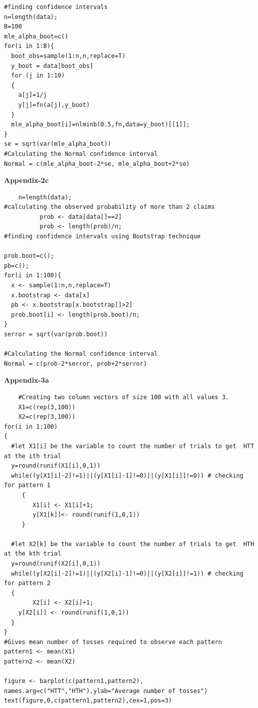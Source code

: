 \documentclass[11pt]{article}
\begin{document}
\begin{enumerate}
\begin{verbatim}
#finding confidence intervals
n=length(data);
B=100
mle_alpha_boot=c()
for(i in 1:B){
  boot_obs=sample(1:n,n,replace=T)
  y_boot = data[boot_obs] 
  for (j in 1:10)
  {
    a[j]=1/j
    y[j]=fn(a[j],y_boot)
  }
  mle_alpha_boot[i]=nlminb(0.5,fn,data=y_boot)[[1]];
}
se = sqrt(var(mle_alpha_boot))
#Calculating the Normal confidence interval
Normal = c(mle_alpha_boot-2*se, mle_alpha_boot+2*se)

	\end{verbatim}


\fontsize{12}{12}
		\textbf{Appendix-2c}
		\fontsize{8}{12}
	\begin{verbatim}
	n=length(data);
#calculating the observed probability of more than 2 claims  
          prob <- data[data[]==2]
          prob <- length(prob)/n;
#finding confidence intervals using Bootstrap technique

prob.boot=c();
pb=c();
for(i in 1:100){
  x <- sample(1:n,n,replace=T)
  x.bootstrap <- data[x] 
  pb <- x.bootstrap[x.bootstrap[]>2]
  prob.boot[i] <- length(prob.boot)/n;
}
serror = sqrt(var(prob.boot))

#Calculating the Normal confidence interval
Normal = c(prob-2*serror, prob+2*serror)

	\end{verbatim}



\fontsize{12}{12}
		\textbf{Appendix-3a}
		\fontsize{8}{12}
	\begin{verbatim}
	#Creating two column vectors of size 100 with all values 3. 
    X1=c(rep(3,100))
    X2=c(rep(3,100))
for(i in 1:100)
{
  #let X1[i] be the variable to count the number of trials to get  HTT at the ith trial
  y=round(runif(X1[i],0,1))
  while((y[X1[i]-2]!=1)||(y[X1[i]-1]!=0)||(y[X1[i]]!=0)) # checking for pattern 1
     {
        X1[i] <- X1[i]+1;
        y[X1[k]]<- round(runif(1,0,1))
     }
  
  #let X2[k] be the variable to count the number of trials to get  HTH at the kth trial
  y=round(runif(X2[i],0,1))
  while((y[X2[i]-2]!=1)||(y[X2[i]-1]!=0)||(y[X2[i]]!=1)) # checking for pattern 2
  {
        X2[i] <- X2[i]+1;
    y[X2[i]] <- round(runif(1,0,1))
  }
}
#Gives mean number of tosses required to observe each pattern
pattern1 <- mean(X1)
pattern2 <- mean(X2)

figure <- barplot(c(pattern1,pattern2), names.arg=c("HTT","HTH"),ylab="Average number of tosses")
text(figure,0,c(pattern1,pattern2),cex=1,pos=3)
\end{verbatim}


\end{enumerate}
\end{document}
